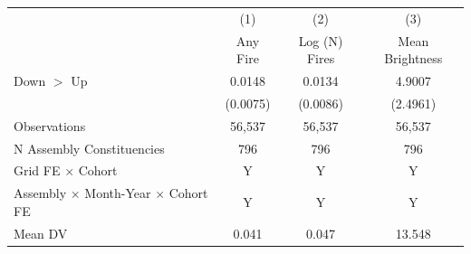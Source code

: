 \begin{tabular}{lccc}
\tabularnewline \hline
& (1) & (2) & (3)\\
& Any Fire & Log (N) Fires & Mean Brightness\\
\hline

Down $>$ Up &      0.0148\sym{**} &      0.0134         &      4.9007\sym{**} \\
            &    (0.0075)         &    (0.0086)         &    (2.4961)         \\
\hline
Observations&      56,537         &      56,537         &      56,537         \\
N Assembly Constituencies&         796         &         796         &         796         \\
Grid FE $\times$ Cohort&           Y         &           Y         &           Y         \\
Assembly $\times$ Month-Year $\times$ Cohort FE&           Y         &           Y         &           Y         \\
Mean DV     &       0.041         &       0.047         &      13.548         \\
\hline
\end{tabular}

